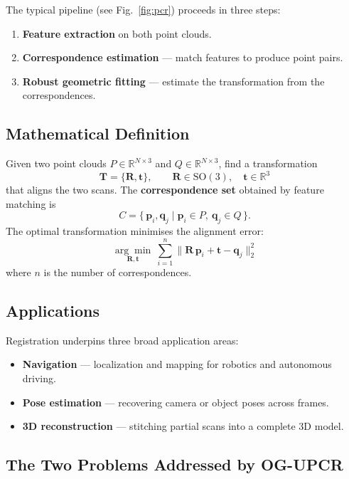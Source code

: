 \documentclass[11pt,a4paper]{article}
\begin{document}
The typical pipeline (see Fig.~\ref{fig:pcr}) proceeds in three steps:
\begin{enumerate}[noitemsep]
  \item \textbf{Feature extraction} on both point clouds.
  \item \textbf{Correspondence estimation} — match features to produce point pairs.
  \item \textbf{Robust geometric fitting} — estimate the transformation from the correspondences.
\end{enumerate}

\subsection{Mathematical Definition}

Given two point clouds $P \in \mathbb{R}^{N\times 3}$ and $Q \in \mathbb{R}^{N\times 3}$,
find a transformation
\[
  \mathbf{T} = \{\mathbf{R}, \mathbf{t}\}, \qquad
  \mathbf{R}\in \mathrm{SO}(3),\quad \mathbf{t}\in\mathbb{R}^3
\]
that aligns the two scans.
The \textbf{correspondence set} obtained by feature matching is
\[
  C = \{\, \mathbf{p}_i, \mathbf{q}_j \mid \mathbf{p}_i \in P,\ \mathbf{q}_j \in Q \,\}.
\]
The optimal transformation minimises the alignment error:
\begin{equation}
  \underset{\mathbf{R},\mathbf{t}}{\arg\min}\ \sum_{i=1}^{n}
  \big\lVert \mathbf{R}\,\mathbf{p}_i + \mathbf{t} - \mathbf{q}_j \big\rVert_2^2
  \tag{1}
\end{equation}
where $n$ is the number of correspondences.

\subsection{Applications}

Registration underpins three broad application areas:
\begin{itemize}[noitemsep]
  \item \textbf{Navigation} — localization and mapping for robotics and autonomous driving.
  \item \textbf{Pose estimation} — recovering camera or object poses across frames.
  \item \textbf{3D reconstruction} — stitching partial scans into a complete 3D model.
\end{itemize}

\subsection{The Two Problems Addressed by OG-UPCR}
\label{sec:problems}
\end{document}
